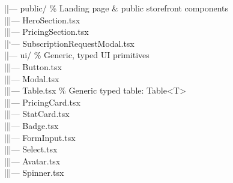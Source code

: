 \documentclass[11pt,a4paper]{article}
\begin{document}
{|\hspace{1.5em}|--- public/ \hfill\textcolor{medgray}{\% Landing page \& public storefront components}\\
|\hspace{1.5em}|\hspace{1.5em}|--- HeroSection.tsx\\
|\hspace{1.5em}|\hspace{1.5em}|--- PricingSection.tsx\\
|\hspace{1.5em}|\hspace{1.5em}`--- SubscriptionRequestModal.tsx\\
|\hspace{1.5em}|--- ui/ \hfill\textcolor{medgray}{\% Generic, typed UI primitives}\\
|\hspace{1.5em}|\hspace{1.5em}|--- Button.tsx\\
|\hspace{1.5em}|\hspace{1.5em}|--- Modal.tsx\\
|\hspace{1.5em}|\hspace{1.5em}|--- Table.tsx \hfill\textcolor{medgray}{\% Generic typed table: Table<T>}\\
|\hspace{1.5em}|\hspace{1.5em}|--- PricingCard.tsx\\
|\hspace{1.5em}|\hspace{1.5em}|--- StatCard.tsx\\
|\hspace{1.5em}|\hspace{1.5em}|--- Badge.tsx\\
|\hspace{1.5em}|\hspace{1.5em}|--- FormInput.tsx\\
|\hspace{1.5em}|\hspace{1.5em}|--- Select.tsx\\
|\hspace{1.5em}|\hspace{1.5em}|--- Avatar.tsx\\
|\hspace{1.5em}|\hspace{1.5em}|--- Spinner.tsx\\
}
\end{document}
